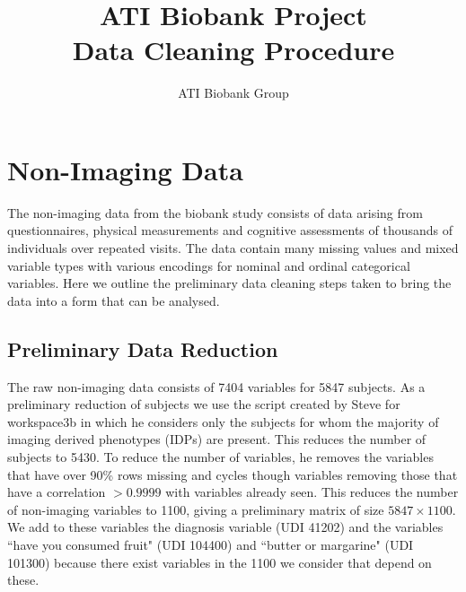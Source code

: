 \documentclass{article}
\begin{document}
\title{ATI Biobank Project \\ Data Cleaning Procedure}

\author{ATI Biobank Group}
\maketitle


\section{Non-Imaging Data}
The non-imaging data from the biobank study consists of data arising from questionnaires, physical measurements and cognitive assessments of thousands of individuals over repeated visits. The data contain many missing values and mixed variable types with various encodings for nominal and ordinal categorical variables. Here we outline the preliminary data cleaning steps taken to bring the data into a form that can be analysed.


\subsection*{Preliminary Data Reduction}
The raw non-imaging data consists of 7404 variables for 5847 subjects. As a preliminary reduction of subjects we use the script created by Steve for workspace3b in which he considers only the subjects for whom the majority of imaging derived phenotypes (IDPs) are present. This reduces the number of subjects to 5430. To reduce the number of variables, he removes the variables that have over 90\% rows missing and cycles though variables removing those that have a correlation $>0.9999$ with variables already seen. This reduces the number of non-imaging variables to 1100, giving a preliminary matrix of size $5847 \times 1100$. We add to these variables the diagnosis variable (UDI 41202) and the variables ``have you consumed fruit" (UDI 104400) and ``butter or margarine" (UDI 101300) because there exist variables in the 1100 we consider that depend on these.
\end{document}
